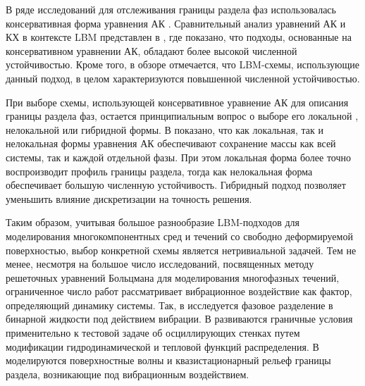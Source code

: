 \documentclass[12pt,a4paper]{article}
\begin{document}
В ряде исследований для отслеживания границы раздела фаз использовалась консервативная форма уравнения АК \cite{Geier2015, Fakhari2016, Fakhari2017, Ren2016, Wang2016, Chai2018, Liu2014, Hong2023, Liang2018}. Сравнительный анализ уравнений АК и КХ в контексте LBM представлен в \cite{Wang2016}, где показано, что подходы, основанные на консервативном уравнении АК, обладают более высокой численной устойчивостью. Кроме того, в обзоре \cite{Wang2019} отмечается, что LBM-схемы, использующие данный подход, в целом характеризуются повышенной численной устойчивостью.

При выборе схемы, использующей консервативное уравнение АК для описания границы раздела фаз, остается принципиальным вопрос о выборе его локальной \cite{Geier2015, Fakhari2016, Ren2016}, нелокальной \cite{Chai2018, Liu2014, Hong2023} или гибридной \cite{Hu2019} формы. В \cite{Chai2018} показано, что как локальная, так и нелокальная формы уравнения АК обеспечивают сохранение массы как всей системы, так и каждой отдельной фазы. При этом локальная форма более точно воспроизводит профиль границы раздела, тогда как нелокальная форма обеспечивает большую численную устойчивость. Гибридный подход \cite{Hu2019} позволяет уменьшить влияние дискретизации на точность решения.

Таким образом, учитывая большое разнообразие LBM-подходов для моделирования многокомпонентных сред и течений со свободно деформируемой поверхностью, выбор конкретной схемы является нетривиальной задачей. Тем не менее, несмотря на большое число исследований, посвященных методу решеточных уравнений Больцмана для моделирования многофазных течений, ограниченное число работ рассматривает вибрационное воздействие как фактор, определяющий динамику системы. Так, в \cite{Chang2010} исследуется фазовое разделение в бинарной жидкости под действием вибрации. В \cite{DOrazio2020} развиваются граничные условия применительно к тестовой задаче об осциллирующих стенках путем модификации гидродинамической и тепловой функций распределения. В \cite{Volodin2020, Volodin2021} моделируются поверхностные волны и квазистационарный рельеф границы раздела, возникающие под вибрационным воздействием.


\end{document}
